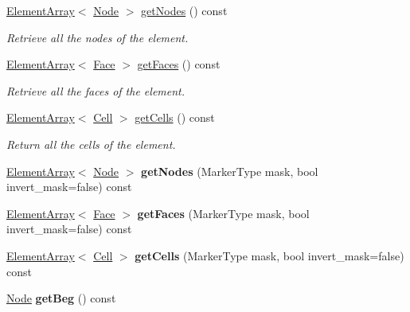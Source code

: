 \begin{DoxyCompactItemize}
\item 
\hyperlink{classINMOST_1_1ElementArray}{Element\-Array}$<$ \hyperlink{classINMOST_1_1Node}{Node} $>$ \hyperlink{classINMOST_1_1Edge_a2e9e02817c50da41d366d9d89ff45bb8}{get\-Nodes} () const 
\begin{DoxyCompactList}\small\item\em Retrieve all the nodes of the element. \end{DoxyCompactList}\item 
\hyperlink{classINMOST_1_1ElementArray}{Element\-Array}$<$ \hyperlink{classINMOST_1_1Face}{Face} $>$ \hyperlink{classINMOST_1_1Edge_abfe4ce06477cfa404306c716d026d2ed}{get\-Faces} () const 
\begin{DoxyCompactList}\small\item\em Retrieve all the faces of the element. \end{DoxyCompactList}\item 
\hyperlink{classINMOST_1_1ElementArray}{Element\-Array}$<$ \hyperlink{classINMOST_1_1Cell}{Cell} $>$ \hyperlink{classINMOST_1_1Edge_ab38cdf43f623abcc12b0befbfac27b90}{get\-Cells} () const 
\begin{DoxyCompactList}\small\item\em Return all the cells of the element. \end{DoxyCompactList}\item 
\hypertarget{classINMOST_1_1Edge_a054c2768b16442babf7021046b3e6449}{\hyperlink{classINMOST_1_1ElementArray}{Element\-Array}$<$ \hyperlink{classINMOST_1_1Node}{Node} $>$ {\bfseries get\-Nodes} (Marker\-Type mask, bool invert\-\_\-mask=false) const }\label{classINMOST_1_1Edge_a054c2768b16442babf7021046b3e6449}

\item 
\hypertarget{classINMOST_1_1Edge_a62432abd01305826fa8506313b26a644}{\hyperlink{classINMOST_1_1ElementArray}{Element\-Array}$<$ \hyperlink{classINMOST_1_1Face}{Face} $>$ {\bfseries get\-Faces} (Marker\-Type mask, bool invert\-\_\-mask=false) const }\label{classINMOST_1_1Edge_a62432abd01305826fa8506313b26a644}

\item 
\hypertarget{classINMOST_1_1Edge_adc1db1a972137a0a1afe4bd607c54944}{\hyperlink{classINMOST_1_1ElementArray}{Element\-Array}$<$ \hyperlink{classINMOST_1_1Cell}{Cell} $>$ {\bfseries get\-Cells} (Marker\-Type mask, bool invert\-\_\-mask=false) const }\label{classINMOST_1_1Edge_adc1db1a972137a0a1afe4bd607c54944}

\item 
\hypertarget{classINMOST_1_1Edge_ad4a038ca78494621360e316c7eb4d2f7}{\hyperlink{classINMOST_1_1Node}{Node} {\bfseries get\-Beg} () const }\label{classINMOST_1_1Edge_ad4a038ca78494621360e316c7eb4d2f7}


\end{DoxyCompactItemize}
